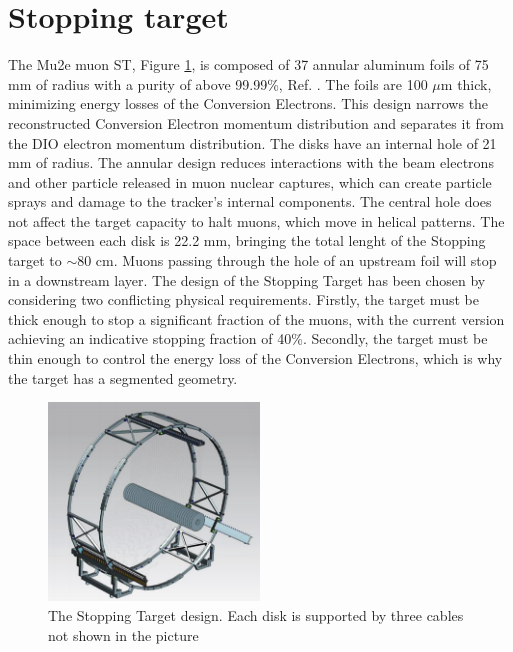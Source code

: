\section{Stopping target}
The Mu2e muon ST, Figure \ref{fig:ST}, is 
composed of 37 annular aluminum foils  of 75 mm of radius with a purity of 
above 99.99\%, Ref. \cite{bobbb}. The foils are 100 $\mu$m thick, 
minimizing energy losses of the Conversion Electrons. This design 
narrows the reconstructed Conversion Electron momentum distribution 
and separates it from the DIO electron momentum distribution. 
The disks have an internal hole of 21 mm of radius.
The annular design reduces interactions with the beam electrons and 
other particle released in muon nuclear captures, which can create 
particle sprays and damage to the tracker's internal components. 
The central hole does not affect the target capacity to halt muons, 
which move in helical patterns. The space between each disk is
22.2 mm, bringing the total lenght of the Stopping target to $\sim$80 cm.
Muons passing through the hole of an upstream foil will stop in a downstream layer. 
The design of the Stopping Target has been chosen by considering two 
conflicting physical requirements. Firstly, the target must be thick enough 
to stop a significant fraction of the muons, with the current version achieving 
an indicative stopping fraction of 40\%. Secondly, the target must be thin 
enough to control the energy loss of the Conversion Electrons, which is why 
the target has a segmented geometry.
\begin{figure}[!h]
    \centering
    \includegraphics[width =0.5\textwidth]{figures/png/Screenshot_20240706_122723.png}
    \caption[The Stopping Target design.]{The Stopping Target design. 
    Each disk is supported by three cables not shown in the picture }
    \label{fig:ST}
\end{figure}

